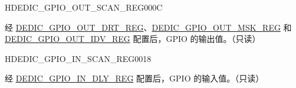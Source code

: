 \begin{register}{H}{DEDIC\_GPIO\_OUT\_SCAN\_REG}{\hexprefix{}000C}\label{regdesc:DEDICGPIOOUTSCANREG}
%
%
\regnewline%
\begin{regdesc}\begin{reglist}
\label{fielddesc:DEDICGPIOOUTSTATUS}\item [DEDIC\_GPIO\_OUT\_STATUS] 经 \hyperref[regdesc:DEDICGPIOOUTDRTREG]{DEDIC\_GPIO\_OUT\_DRT\_REG}、\hyperref[regdesc:DEDICGPIOOUTMSKREG]{DEDIC\_GPIO\_OUT\_MSK\_REG} 和 \hyperref[regdesc:DEDICGPIOOUTIDVREG]{DEDIC\_GPIO\_OUT\_IDV\_REG} 配置后，GPIO 的输出值。（只读）
\end{reglist}\end{regdesc}
\end{register}


\begin{register}{H}{DEDIC\_GPIO\_IN\_SCAN\_REG}{\hexprefix{}0018}\label{regdesc:DEDICGPIOINSCANREG}
%
%
\regnewline%
\begin{regdesc}\begin{reglist}
\label{fielddesc:DEDICGPIOINSTATUS}\item [DEDIC\_GPIO\_IN\_STATUS] 经 \hyperref[regdesc:DEDICGPIOINDLYREG]{DEDIC\_GPIO\_IN\_DLY\_REG} 配置后，GPIO 的输入值。（只读）
\end{reglist}\end{regdesc}
\end{register}


